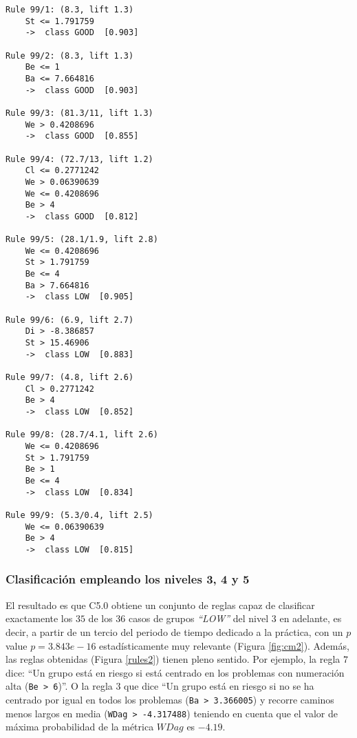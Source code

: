\begin{tcolorbox}[title=Reglas de clasificación para identificar grupos de tipo \emph{``LOW''}.]
  \makeatletter
  \makeatother
\begin{multicols}{2}
    \begin{verbatim}
Rule 99/1: (8.3, lift 1.3)
	St <= 1.791759
	->  class GOOD  [0.903]

Rule 99/2: (8.3, lift 1.3)
	Be <= 1
	Ba <= 7.664816
	->  class GOOD  [0.903]

Rule 99/3: (81.3/11, lift 1.3)
	We > 0.4208696
	->  class GOOD  [0.855]

Rule 99/4: (72.7/13, lift 1.2)
	Cl <= 0.2771242
	We > 0.06390639
	We <= 0.4208696
	Be > 4
	->  class GOOD  [0.812]

Rule 99/5: (28.1/1.9, lift 2.8)
	We <= 0.4208696
	St > 1.791759
	Be <= 4
	Ba > 7.664816
	->  class LOW  [0.905]

Rule 99/6: (6.9, lift 2.7)
	Di > -8.386857
	St > 15.46906
	->  class LOW  [0.883]

Rule 99/7: (4.8, lift 2.6)
	Cl > 0.2771242
	Be > 4
	->  class LOW  [0.852]

Rule 99/8: (28.7/4.1, lift 2.6)
	We <= 0.4208696
	St > 1.791759
	Be > 1
	Be <= 4
	->  class LOW  [0.834]

Rule 99/9: (5.3/0.4, lift 2.5)
	We <= 0.06390639
	Be > 4
	->  class LOW  [0.815]
    \end{verbatim}
  \end{multicols}
\label{rules3}
\end{tcolorbox}

\subsubsection{Clasificación empleando los niveles 3, 4 y 5}

El resultado es que C5.0 obtiene un conjunto de reglas capaz de clasificar exactamente los $35$ de los $36$ casos de grupos \emph{``LOW''} del nivel $3$ en adelante, es decir, a partir de un tercio del periodo de tiempo dedicado a la práctica, con un $p$ value $p = 3.843e-16$ estadísticamente muy relevante (Figura \ref{fig:cm2}). Además, las reglas obtenidas (Figura \ref{rules2}) tienen pleno sentido. Por ejemplo, la regla $7$ dice: ``Un grupo está en riesgo si está centrado en los problemas con numeración alta (\texttt{Be > 6})''. O la regla $3$ que dice ``Un grupo está en riesgo si no se ha centrado por igual en todos los problemas (\texttt{Ba > 3.366005}) y recorre caminos menos largos en media (\texttt{WDag > -4.317488}) teniendo en cuenta que el valor de máxima probabilidad de la métrica $WDag$ es $-4.19$.

